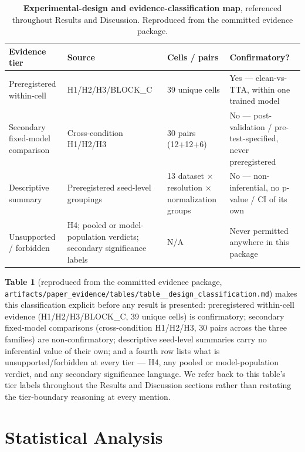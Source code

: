 \begin{table}[t]
\centering
\small
\begin{tabular}{@{}p{2.6cm}p{3.4cm}p{2.4cm}p{4.4cm}@{}}
\toprule
\textbf{Evidence tier} & \textbf{Source} & \textbf{Cells / pairs} & \textbf{Confirmatory?} \\
\midrule
Preregistered within-cell & H1/H2/H3/BLOCK\_C & 39 unique cells & Yes --- clean-vs-TTA, within one trained model \\
Secondary fixed-model comparison & Cross-condition H1/H2/H3 & 30 pairs (12+12+6) & No --- post-validation / pre-test-specified, never preregistered \\
Descriptive summary & Preregistered seed-level groupings & 13 dataset $\times$ resolution $\times$ normalization groups & No --- non-inferential, no p-value / CI of its own \\
Unsupported / forbidden & H4; pooled or model-population verdicts; secondary significance labels & N/A & Never permitted anywhere in this package \\
\bottomrule
\end{tabular}
\caption{\textbf{Experimental-design and evidence-classification map}, referenced throughout Results and Discussion. Reproduced from the committed evidence package.}
\label{tab:design}
\end{table}

\textbf{Table 1} (reproduced from the committed evidence package, \texttt{artifacts/\allowbreak paper\_\allowbreak evidence/\allowbreak tables/\allowbreak table\_\_\allowbreak design\_\allowbreak classification.md}) makes this classification explicit before any result is presented: preregistered within-cell evidence (H1/H2/H3/BLOCK\_C, 39 unique cells) is confirmatory; secondary fixed-model comparisons (cross-condition H1/H2/H3, 30 pairs across the three families) are non-confirmatory; descriptive seed-level summaries carry no inferential value of their own; and a fourth row lists what is unsupported/forbidden at every tier --- H4, any pooled or model-population verdict, and any secondary significance language. We refer back to this table's tier labels throughout the Results and Discussion sections rather than restating the tier-boundary reasoning at every mention.

\section{Statistical Analysis}

